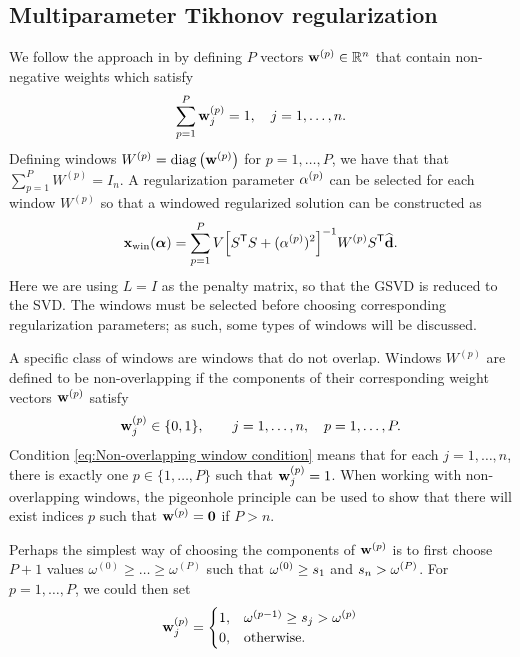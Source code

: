 \documentclass[12pt]{article}
\begin{document}
\subsection{Multiparameter Tikhonov regularization} \label{sec:Multiparameter}
We follow the approach in \cite{ChungEasleyOLeary} by defining $P$ vectors $\mathbf{w}^{(p)} \in \mathbb{R}^n$ that contain non-negative weights which satisfy
\begin{equation}
\label{eq:Weights}
\sum_{p=1}^{P} \mathbf{w}_j^{(p)} = 1, \quad j = 1,\ldots,n.
\end{equation}
Defining windows $W^{(p)} = \operatorname{diag}\left(\mathbf{w}^{(p)}\right)$ for $p = 1,\ldots,P$, we have that that $\sum_{p=1}^P W^{(p)} = I_n$. A regularization parameter $\alpha^{(p)}$ can be selected for each window $W^{(p)}$ so that a windowed regularized solution can be constructed as
\begin{equation}
\label{eq:TikSolWindow}
\mathbf{x}_{\text{win}}(\bm{\alpha}) = \sum_{p=1}^P V{\left[{S}^\mathsf{T}S + (\alpha^{(p)})^2\right]}^{-1}W^{(p)}{S}^\mathsf{T}\widehat{\mathbf{d}}.
\end{equation}
Here we are using $L = I$ as the penalty matrix, so that the GSVD is reduced to the SVD. The windows must be selected before choosing corresponding regularization parameters; as such, some types of windows will be discussed. \par
A specific class of windows are windows that do not overlap. Windows $W^{(p)}$ are defined to be non-overlapping if the components of their corresponding weight vectors $\mathbf{w}^{(p)}$ satisfy
\begin{equation}
\label{eq:Non-overlapping window condition}
    \mathbf{w}_j^{(p)} \in \{0,1\}, \qquad j = 1,\ldots,n, \quad p = 1,\ldots,P.
\end{equation}
Condition \eqref{eq:Non-overlapping window condition} means that for each $j = 1,\ldots,n$, there is exactly one $p \in \{1,\ldots,P\}$ such that $\mathbf{w}_j^{(p)} = 1$. When working with non-overlapping windows, the pigeonhole principle \cite{DummitFoote3} can be used to show that there will exist indices $p$ such that $\mathbf{w}^{(p)} = \bm{0}$ if $P > n$. \par
Perhaps the simplest way of choosing the components of $\mathbf{w}^{(p)}$ is to first choose $P+1$ values $\omega^{(0)} \geq \ldots \geq \omega^{(P)}$ such that $\omega^{(0)} \geq s_1$ and $s_n > \omega^{(P)}$. For $p = 1,\ldots,P$, we could then set
\begin{equation}
\label{eq:Non-overlapping windows}
\mathbf{w}_j^{(p)} = \begin{cases}
1, & \omega^{(p-1)} \geq s_j > \omega^{(p)} \\
0, & \text{otherwise.}
\end{cases}
\end{equation}
\end{document}
